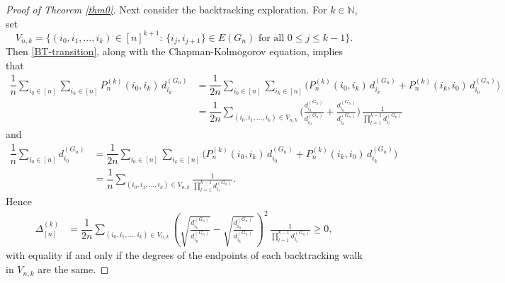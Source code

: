 \documentclass[11pt]{article}
\numberwithin{equation}{section}
\theoremstyle{plain}
\newcommand{\N}{\mathbb N}
\newcommand{\dn}{d^{(G_{n})}}
\begin{document}
\begin{proof}[Proof of Theorem \ref{thm0}]
Next consider the backtracking exploration. For $k\in\N$, set 
\[
V_{n,k}=\Big\{(i_{0},i_{1},\ldots ,i_{k})\in [n]^{k+1}\colon\,\{i_{j},i_{j+1}\}\in E(G_{n})\text{ for all }0\leq j\leq k-1\Big\}.
\]
Then \eqref{BT-transition}, along with the Chapman-Kolmogorov equation, implies that
\begin{align*}
\dfrac{1}{n}\sum_{i_{0}\in [n]}\sum_{i_{k}\in [n]} P_{n}^{(k)}(i_{0},i_{k}) \,\dn_{i_{k}} 
&=\dfrac{1}{2n}\sum_{i_{0}\in [n]}\sum_{i_{k}\in [n]}\Big(P_{n}^{(k)}(i_{0},i_{k})\,\dn_{i_{k}}
+P_{n}^{(k)}(i_{k},i_{0})\,\dn_{i_{0}}\Big)\\
&=\dfrac{1}{2n}\sum_{(i_{0},i_{1},\ldots ,i_{k})\in V_{n,k}}\bigg(\frac{\dn_{i_{k}}}{\dn_{i_{0}}}
+\frac{\dn_{i_{0}}}{\dn_{i_{k}}}\bigg)\,\frac{1}{\prod_{l=1}^{k-1}\dn_{i_{l}}}
\end{align*}
and
\begin{align*}
\dfrac{1}{n}\sum_{i_{0}\in [n]} \dn_{i_{0}}
&=\dfrac{1}{2n}\sum_{i_{0}\in [n]}\sum_{i_{k}\in [n]}\Big(P_{n}^{(k)}(i_{0},i_{k})\,\dn_{i_{0}}
+P_{n}^{(k)}(i_{k},i_{0})\,\dn_{i_{k}}\Big)\\
&=\dfrac{1}{n}\sum_{(i_{0},i_{1},\ldots ,i_{k})\in V_{n,k}}\frac{1}{\prod_{l=1}^{k-1}\dn_{i_{l}}}.
\end{align*}
Hence
\begin{align*}
\Delta_{[n]}^{(k)} &=\dfrac{1}{2n}\sum_{(i_{0},i_{1},\ldots ,i_{k})\in V_{n,k}}\left(\sqrt{\frac{\dn_{i_{k}}}{\dn_{i_{0}}}}
-\sqrt{\frac{\dn_{i_{0}}}{\dn_{i_{k}}}}\,\right)^{2}\,\frac{1}{\prod_{l=1}^{k-1}\dn_{i_{l}}} \geq 0,
\end{align*}
with equality if and only if the degrees of the endpoints of each backtracking walk in $V_{n,k}$ are the same. 


\end{proof}
\end{document}
